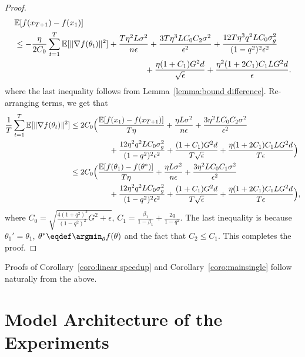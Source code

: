\documentclass[11pt]{article}
\begin{document}
\begin{proof}
\begin{align*}
    &\mathbb E[f(x_{T+1})-f(x_1)]\\
    &\leq -\frac{\eta}{2C_0}\sum_{t=1}^T\mathbb E[\|\nabla f(\theta_t)\|^2]+\frac{T\eta^2 L \sigma^2}{n\epsilon}+\frac{3T\eta^3 LC_0C_2\sigma^2}{\epsilon^2}+\frac{12T\eta^3q^2LC_0\sigma_g^2}{(1-q^2)^2\epsilon^2}  \\
    &\hspace{2.2in} + \frac{\eta (1+C_1)G^2d}{\sqrt\epsilon}+\frac{\eta^2 (1+2C_1)C_1LG^2d}{\epsilon}.
\end{align*}
where the last inequality follows from Lemma~\ref{lemma:bound difference}. Re-arranging terms, we get that
\begin{align*}
    \frac{1}{T}\sum_{t=1}^T \mathbb E[\|\nabla f(\theta_t)\|^2]&\leq 2C_0\Big(\frac{\mathbb E[f(x_1)-f(x_{T+1})]}{T\eta}+\frac{\eta L \sigma^2}{n\epsilon}+\frac{3\eta^2 LC_0C_2\sigma^2}{\epsilon^2}  \\
    &\hspace{0.7in} + \frac{12\eta^2q^2LC_0\sigma_g^2}{(1-q^2)^2\epsilon^2}+\frac{ (1+C_1)G^2d}{T\sqrt\epsilon}+\frac{\eta (1+2C_1)C_1LG^2d}{T\epsilon} \Big)\\
    &\leq 2C_0\Big(\frac{\mathbb E[f(\theta_1)-f(\theta^*)]}{T\eta}+\frac{\eta L \sigma^2}{n\epsilon}+\frac{3\eta^2 LC_0C_1\sigma^2}{\epsilon^2}  \\
    &\hspace{0.7in} + \frac{12\eta^2q^2LC_0\sigma_g^2}{(1-q^2)^2\epsilon^2}+\frac{ (1+C_1)G^2d}{T\sqrt\epsilon}+\frac{\eta (1+2C_1)C_1LG^2d}{T\epsilon} \Big),
\end{align*}
where $C_0=\sqrt{\frac{4(1+q^2)^3}{(1-q^2)^2}G^2+\epsilon}$, $C_1=\frac{\beta_1}{1-\beta_1}+\frac{2q}{1-q^2}$. The last inequality is because $\theta_1'=\theta_1$, $\theta^* \eqdef \argmin_\theta f(\theta)$ and the fact that $C_2\leq C_1$. This completes the proof.
\end{proof}

Proofs of Corollary~\ref{coro:linear speedup} and Corollary~\ref{coro:mainsingle} follow naturally from the above.



\section{Model Architecture of the Experiments}
\end{document}

